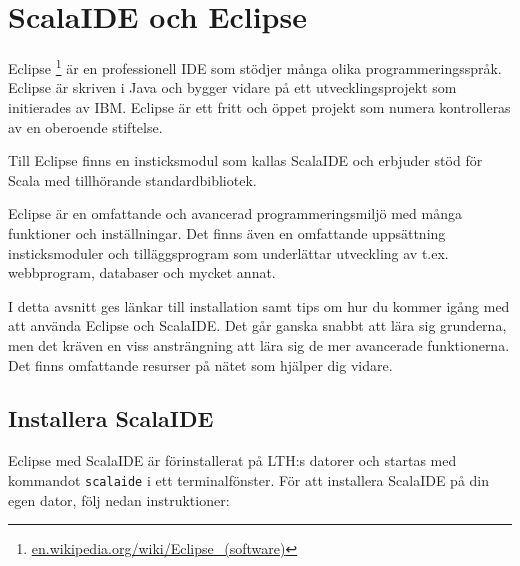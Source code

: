 \newpage

\section{ScalaIDE och Eclipse}\label{appendix:ide:eclipse}

Eclipse%
\footnote{\href{https://en.wikipedia.org/wiki/Eclipse_(software)}{en.wikipedia.org/wiki/Eclipse\_(software)}}
är en professionell IDE som stödjer många olika programmeringsspråk. Eclipse är skriven i Java och bygger vidare på ett utvecklingsprojekt som initierades av IBM. Eclipse är ett fritt och öppet projekt som numera kontrolleras av en oberoende stiftelse.

Till Eclipse finns en insticksmodul  som kallas ScalaIDE och erbjuder stöd för Scala med tillhörande standardbibliotek.

Eclipse är en omfattande och avancerad programmeringsmiljö med många funktioner och inställningar. Det finns även en omfattande uppsättning insticksmoduler och tilläggsprogram som underlättar utveckling av t.ex. webbprogram, databaser och mycket annat.

I detta avsnitt ges länkar till installation samt tips om hur du kommer igång med att använda Eclipse och ScalaIDE. Det går ganska snabbt att lära sig grunderna, men det kräven en viss ansträngning att lära sig de mer avancerade funktionerna. Det finns omfattande resurser på nätet som hjälper dig vidare.


\subsection{Installera ScalaIDE}\label{appendix:ide:eclipse:install}

Eclipse med ScalaIDE är förinstallerat på LTH:s datorer och startas med kommandot \texttt{scalaide} i ett terminalfönster.
För att installera ScalaIDE på din egen dator, följ nedan instruktioner:

